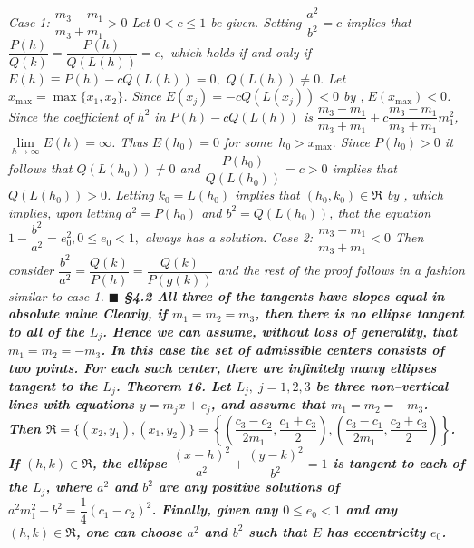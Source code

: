 \nl \it Case 1: \rm $\dfrac{m_{3}-m_{1}}{m_{3}+m_{1}}>0$ \nl
Let $0<c\leq 1$ be given. Setting $\dfrac{a^{2}}{b^{2}}=c$ implies that $\dfrac{P(h)}{Q(k)}=\dfrac{P(h)}{Q(L(h))}=c,$ which holds if and only if $E(h)\equiv P(h)-cQ(L(h))=0,$ $Q(L(h))\neq 0.$ Let $x_{\max }=\max \{x_{1},x_{2}\}$. Since $E(x_{j})=-cQ(L(x_{j}))<0$ by  ,$\;E(x_{\max })<0$. Since the coefficient of $h^{2}$ in $P(h)-cQ(L(h))$ is $\dfrac{m_{3}-m_{1}}{m_{3}+m_{1}}+c\dfrac{m_{3}-m_{1}}{m_{3}+m_{1}}m_{1}^{2}$, $\lim\limits_{h\rightarrow \infty }E(h)=\infty $. Thus $E(h_{0})=0$ for some\ $h_{0}>x_{\max }.$ Since $P(h_{0})>0$ it follows that $Q(L(h_{0}))\neq 0$ and $\dfrac{P(h_{0})}{Q(L(h_{0}))}=c>0$ implies that $Q(L(h_{0}))>0$. Letting $k_{0}=L(h_{0})$ implies that $(h_{0},k_{0})\in \Re $ by , which implies, upon letting $a^{2}=P(h_{0})$ and $b^{2}=Q(L(h_{0}))$, that the equation $1-\dfrac{b^{2}}{a^{2}}=e_{0}^{2},0\leq e_{0}<1,$ always has a solution. 
\nl \it Case 2: \rm $\dfrac{m_{3}-m_{1}}{m_{3}+m_{1}}<0$ \nl 
Then consider $\dfrac{b^{2}}{a^{2}}=\dfrac{Q(k)}{P(h)}=\dfrac{Q(k)}{P(g(k))}$ and the rest of the proof follows in a fashion similar to case 1.  $\blacksquare$ \nl \nl
\bf \S 4.2 All three of the tangents have slopes equal in absolute value \rm \nl
	Clearly, if $m_{1}=m_{2}=m_{3}$, then there is no ellipse tangent to all of the $L_{j}$. Hence we can assume, without loss of generality, that $m_{1}=m_{2}=-m_{3}$. In this case the set of admissible centers consists of two points. For each such center, there are infinitely many ellipses tangent to the $L_{j}$. 
\nl \nl \bf Theorem 16. \rm Let $L_{j},\;j=1,2,3$ be three non--vertical lines with equations $y=m_{j}x+c_{j}$, and assume that $m_{1}=m_{2}=-m_{3}$. Then $\Re =\{(x_{2},y_{1}),(x_{1},y_{2})\}=\left\{ \left( \dfrac{c_{3}-c_{2}}{2m_{1}},\dfrac{c_{1}+c_{3}}{2}\right) ,\left( \dfrac{c_{3}-c_{1}}{2m_{1}},\dfrac{c_{2}+c_{3}}{2}\right) \right\} $. If $(h,k)\in \Re $, the ellipse $\dfrac{(x-h)^{2}}{a^{2}}+\dfrac{(y-k)^{2}}{b^{2}}=1$ is tangent to each of the $L_{j}$, where $a^{2}$ and $b^{2}$ are any positive solutions of $a^{2}m_{1}^{2}+b^{2}=\dfrac{1}{4}(c_{1}-c_{2})^{2}$. Finally, given any $0\leq e_{0}<1$ and any $(h,k)\in \Re $, one can choose $a^{2}$ and $b^{2}$ such that $E$ has eccentricity $e_{0}$. 
